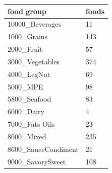 {\footnotesize\setlength{\tabcolsep}{3pt}
\begin{longtable}{ll}
\toprule
\textbf{food group} & \textbf{foods} \\
\midrule
\endhead
10000\_Beverages & 11 \\
1000\_Grains & 143 \\
2000\_Fruit & 57 \\
3000\_Vegetables & 374 \\
4000\_LegNut & 69 \\
5000\_MPE & 98 \\
5800\_Seafood & 83 \\
6000\_Dairy & 4 \\
7000\_Fats Oils & 23 \\
8000\_Mixed & 235 \\
8600\_SauceCondiment & 21 \\
9000\_SavorySweet & 108 \\
\bottomrule
\end{longtable}}
